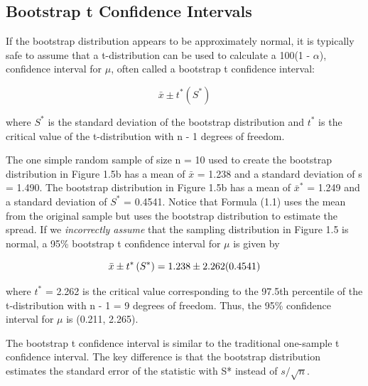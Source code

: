 \documentclass[
]{report}
\begin{document}
\hypertarget{bootstrap-t-confidence-intervals}{%
\subsection*{Bootstrap t Confidence Intervals}\label{bootstrap-t-confidence-intervals}}

If the bootstrap distribution appears to be approximately normal, it is typically safe to assume that a t-distribution can be used to calculate a 100(1 - \(\scriptstyle \alpha\)), confidence interval for \(\scriptstyle \mu\), often called a bootstrap t confidence interval:

\begin{equation} 
  \bar{x} \pm t^*\left(S^*\right)
  \tag{1.1} \label{eq:1_1}
\end{equation}

where \(\scriptstyle S^*\) is the standard deviation of the bootstrap distribution and \(\scriptstyle t^*\) is the critical value of the t-distribution with n - 1 degrees of freedom.

The one simple random sample of size n = 10 used to create the bootstrap distribution in Figure 1.5b has a mean of \(\scriptstyle \bar{x}\) = 1.238 and a standard deviation of s = 1.490. The bootstrap distribution in Figure 1.5b has a mean of \(\scriptstyle \bar{x}^*\) = 1.249 and a standard deviation of \(\scriptstyle S^*\) = 0.4541. Notice that Formula (1.1) uses the mean from the original sample but uses the bootstrap distribution to estimate the spread. If we \emph{incorrectly assume} that the sampling distribution in Figure 1.5 is normal, a 95\% bootstrap t confidence interval for \(\scriptstyle \mu\) is given by

\begin{equation} 
  \bar{x} \pm t^*\left(S^*\right) = 1.238 \pm 2.262(0.4541)
  \notag
\end{equation}

where \(\scriptstyle t^*\) = 2.262 is the critical value corresponding to the 97.5th percentile of the t-distribution with n - 1 = 9 degrees of freedom. Thus, the 95\% confidence interval for \(\scriptstyle \mu\) is (0.211, 2.265).

The bootstrap t confidence interval is similar to the traditional one-sample t confidence interval. The key difference is that the bootstrap distribution estimates the standard error of the statistic with S* instead of \(\scriptstyle s/ \sqrt{n}\).
\end{document}
